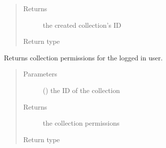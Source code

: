 \documentclass[letterpaper,10pt,english]{sphinxmanual}
\begin{document}
\begin{fulllineitems}
\begin{fulllineitems}
\begin{quote}
\begin{description}
\item[{Returns}] \leavevmode
\sphinxAtStartPar
the created collection’s ID

\item[{Return type}] \leavevmode
\sphinxAtStartPar
{}

\end{description}\end{quote}

\end{fulllineitems}


\begin{fulllineitems}
\label{\detokenize{autoapi/pine/client/client/index:pine.client.client.PineClient.get_collection_permissions}}
\sphinxAtStartPar
Returns collection permissions for the logged in user.
\begin{quote}\begin{description}
\item[{Parameters}] \leavevmode
\sphinxAtStartPar
{} () \textendash{} the ID of the collection

\item[{Returns}] \leavevmode
\sphinxAtStartPar
the collection permissions

\item[{Return type}] \leavevmode
\sphinxAtStartPar
{\hyperref[\detokenize{autoapi/pine/backend/models/index:pine.backend.models.CollectionUserPermissions}]{}}

\end{description}\end{quote}

\end{fulllineitems}


\end{fulllineitems}
\end{document}
